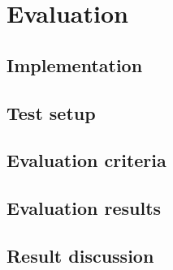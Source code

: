 \chapter{Evaluation}\label{sec:evaluation}


\section{Implementation}

\section{Test setup}

\section{Evaluation criteria}

\section{Evaluation results}

\section{Result discussion}